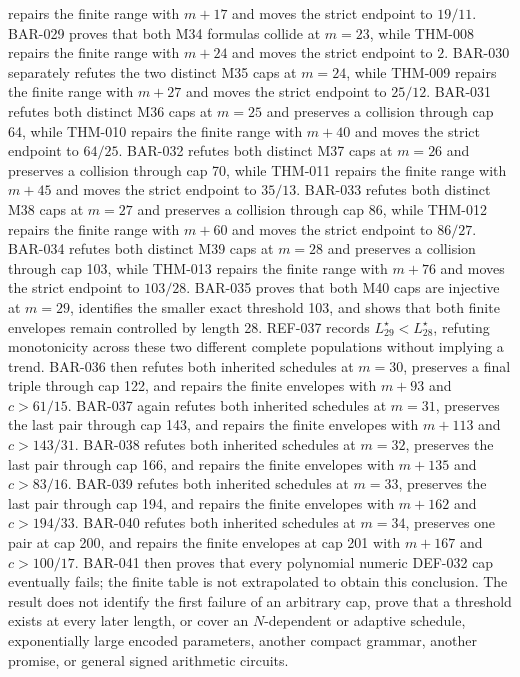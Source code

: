 \documentclass[11pt]{article}
\begin{document}
repairs the finite range with \(m+17\) and moves the strict endpoint to
\(19/11\). BAR-029 proves that both M34 formulas collide at \(m=23\), while
THM-008 repairs the finite range with \(m+24\) and moves the strict endpoint
to \(2\). BAR-030 separately refutes the two distinct M35 caps at \(m=24\),
while THM-009 repairs the finite range with \(m+27\) and moves the strict
endpoint to \(25/12\). BAR-031 refutes both distinct M36 caps at \(m=25\)
and preserves a collision through cap 64, while THM-010 repairs the finite
range with \(m+40\) and moves the strict endpoint to \(64/25\). BAR-032
refutes both distinct M37 caps at \(m=26\) and preserves a collision through
cap 70, while THM-011 repairs the finite range with \(m+45\) and moves the
strict endpoint to \(35/13\). BAR-033 refutes both distinct M38 caps at
\(m=27\) and preserves a collision through cap 86, while THM-012 repairs the
finite range with \(m+60\) and moves the strict endpoint to \(86/27\).
BAR-034 refutes both distinct M39 caps at \(m=28\) and preserves a collision
through cap 103, while THM-013 repairs the finite range with \(m+76\) and
moves the strict endpoint to \(103/28\). BAR-035 proves that both M40 caps
are injective at \(m=29\), identifies the smaller exact threshold 103, and
shows that both finite envelopes remain controlled by length 28. REF-037
records \(L_{29}^{\star}<L_{28}^{\star}\), refuting monotonicity across these
two different complete populations without implying a trend. BAR-036 then
refutes both inherited schedules at \(m=30\), preserves a final triple through
cap 122, and repairs the finite envelopes with \(m+93\) and \(c>61/15\).
BAR-037 again refutes both inherited schedules at \(m=31\), preserves the
last pair through cap 143, and repairs the finite envelopes with \(m+113\)
and \(c>143/31\). BAR-038 refutes both inherited schedules at \(m=32\),
preserves the last pair through cap 166, and repairs the finite envelopes
with \(m+135\) and \(c>83/16\). BAR-039 refutes both inherited schedules
at \(m=33\), preserves the last pair through cap 194, and repairs the
finite envelopes with \(m+162\) and \(c>194/33\). BAR-040 refutes both
inherited schedules at \(m=34\), preserves one pair at cap 200, and repairs
the finite envelopes at cap 201 with \(m+167\) and \(c>100/17\). BAR-041
then proves that every polynomial numeric DEF-032 cap eventually fails; the
finite table is not extrapolated to obtain this conclusion. The result does
not identify the first failure of an arbitrary cap, prove that a threshold
exists at every later length, or cover an \(N\)-dependent or adaptive
schedule, exponentially large encoded parameters, another compact grammar,
another promise, or general signed arithmetic circuits.
\end{document}
